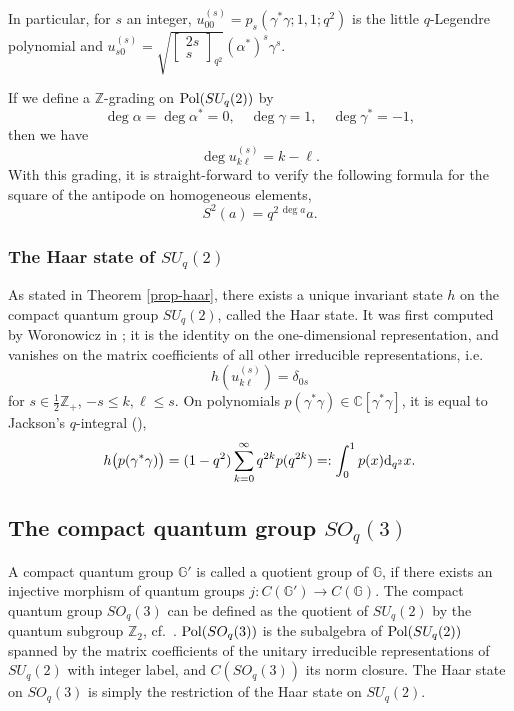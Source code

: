 \documentclass[12pt]{amsart}
\theoremstyle{definition}
\theoremstyle{remark}
\numberwithin{equation}{section}
\begin{document}
In particular, for $s$ an integer,
$u^{(s)}_{00}=p_{s}(\gamma^*\gamma;1,1;q^2)$ is the little $q$-Legendre polynomial
and $u^{(s)}_{s0}=\sqrt{\left[\begin{array}{c} 2s \\ s \end{array}\right]_{q^2}}(\alpha^*)^s\gamma^s$.

If we define a $\mathbb{Z}$-grading on ${\rm Pol} (SU_q(2))$ by
\[
\deg \alpha = \deg\alpha^*=0,\quad \deg \gamma=1,\quad
\deg\gamma^*=-1,
\]
then we have
\[
\deg u^{(s)}_{k\ell} = k-\ell.
\]
With this grading, it is straight-forward to verify the following formula for the square of the antipode on 
homogeneous elements,
\begin{equation}\label{S square}
S^2(a) = q^{2\,\deg a} a.
\end{equation}

\subsubsection{The Haar state of $SU_q(2)$}

As stated in Theorem \ref{prop-haar}, there exists a unique invariant state $h$ on the compact
quantum group $SU_q(2)$, called the Haar state. It was first computed by Woronowicz in \cite{woronowicz87}; it is the identity on the
one-dimensional representation, and vanishes on the matrix coefficients of all other irreducible
representations, i.e.\
\[
h\left(u^{(s)}_{k\ell}\right) = \delta_{0s}
\]
for $s\in\frac{1}{2}\mathbb{Z}_+$, $-s\le k,\ell\le s$. On polynomials $p(\gamma^*\gamma)\in\mathbb{C}[\gamma^*\gamma]$, it is
equal to Jackson's $q$-integral (\cite{koornwinder89}),
\[
h\big(p(\gamma^*\gamma)\big) = (1-q^2) \sum_{k=0}^\infty q^{2k} p(q^{2k}) =:
\int_0^1 p(x) {\rm d}_{q^2}x.
\]

\subsection{The compact quantum group $SO_q(3)$}
A compact quantum group ${\mathbb{G}}'$ is called a quotient group of ${\mathbb{G}}$, if there exists an injective morphism of 
quantum groups $j:C({\mathbb{G}}')\to C({\mathbb{G}})$. The compact quantum group $SO_q(3)$ can be defined as the quotient of 
$SU_q(2)$ by the quantum subgroup $\mathbb{Z}_2$, cf.\ \cite{podles95}. ${\rm Pol} (SO_q(3))$ is the subalgebra 
of ${\rm Pol} (SU_q(2))$ spanned by the matrix coefficients of the unitary irreducible representations of 
$SU_q(2)$ with integer label, and $C(SO_q(3))$ its norm closure. The Haar state on $SO_q(3)$ is simply the 
restriction of the Haar state on $SU_q(2)$.
\end{document}
